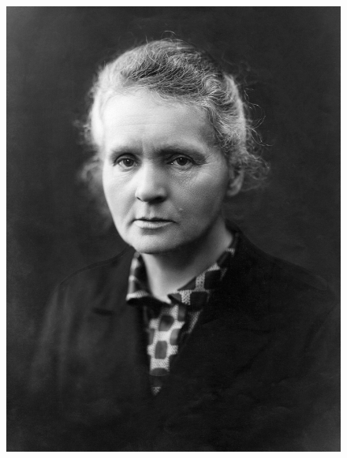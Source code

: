 \documentclass[crop=false]{standalone}
\begin{document}
\begin{figure}[H]
    \includegraphics[width=\linewidth]{images/marie-curie-sklodowska.jpg}
  \endminipage\hfill

\end{figure}
\end{document}
